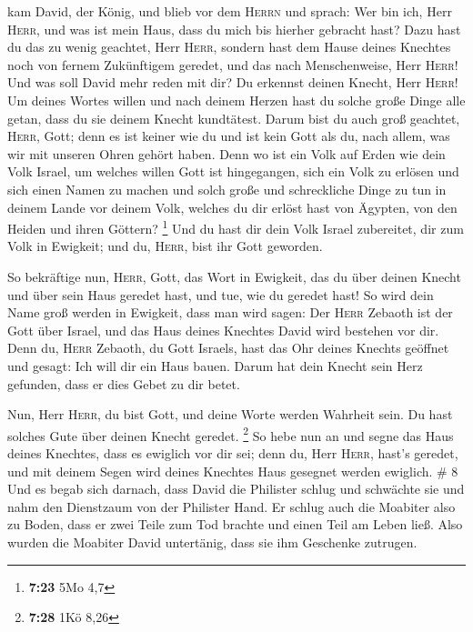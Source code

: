  kam David, der König, und blieb vor dem \textsc{Herrn}
und sprach: Wer bin ich, Herr \textsc{Herr}, und was ist mein Haus, dass
du mich bis hierher gebracht hast?  Dazu hast du das zu
wenig geachtet, Herr \textsc{Herr}, sondern hast dem Hause deines
Knechtes noch von fernem Zukünftigem geredet, und das nach
Menschenweise, Herr \textsc{Herr}!  Und was soll David
mehr reden mit dir? Du erkennst deinen Knecht, Herr \textsc{Herr}!
 Um deines Wortes willen und nach deinem Herzen hast du
solche große Dinge alle getan, dass du sie deinem Knecht kundtätest.
 Darum bist du auch groß geachtet, \textsc{Herr}, Gott;
denn es ist keiner wie du und ist kein Gott als du, nach allem, was wir
mit unseren Ohren gehört haben.  Denn wo ist ein Volk auf
Erden wie dein Volk Israel, um welches willen Gott ist hingegangen, sich
ein Volk zu erlösen und sich einen Namen zu machen und solch große und
schreckliche Dinge zu tun in deinem Lande vor deinem Volk, welches du
dir erlöst hast von Ägypten, von den Heiden und ihren Göttern?
\footnote{\textbf{7:23} 5Mo 4,7}  Und du hast dir dein
Volk Israel zubereitet, dir zum Volk in Ewigkeit; und du, \textsc{Herr},
bist ihr Gott geworden.

 So bekräftige nun, \textsc{Herr}, Gott, das Wort in
Ewigkeit, das du über deinen Knecht und über sein Haus geredet hast, und
tue, wie du geredet hast!  So wird dein Name groß werden
in Ewigkeit, dass man wird sagen: Der \textsc{Herr} Zebaoth ist der Gott
über Israel, und das Haus deines Knechtes David wird bestehen vor dir.
 Denn du, \textsc{Herr} Zebaoth, du Gott Israels, hast
das Ohr deines Knechts geöffnet und gesagt: Ich will dir ein Haus bauen.
Darum hat dein Knecht sein Herz gefunden, dass er dies Gebet zu dir
betet.

 Nun, Herr \textsc{Herr}, du bist Gott, und deine Worte
werden Wahrheit sein. Du hast solches Gute über deinen Knecht geredet.
\footnote{\textbf{7:28} 1Kö 8,26}  So hebe nun an und
segne das Haus deines Knechtes, dass es ewiglich vor dir sei; denn du,
Herr \textsc{Herr}, hast's geredet, und mit deinem Segen wird deines
Knechtes Haus gesegnet werden ewiglich. \# 8  Und es begab
sich darnach, dass David die Philister schlug und schwächte sie und nahm
den Dienstzaum von der Philister Hand.  Er schlug auch die
Moabiter also zu Boden, dass er zwei Teile zum Tod brachte und einen
Teil am Leben ließ. Also wurden die Moabiter David untertänig, dass sie
ihm Geschenke zutrugen.

